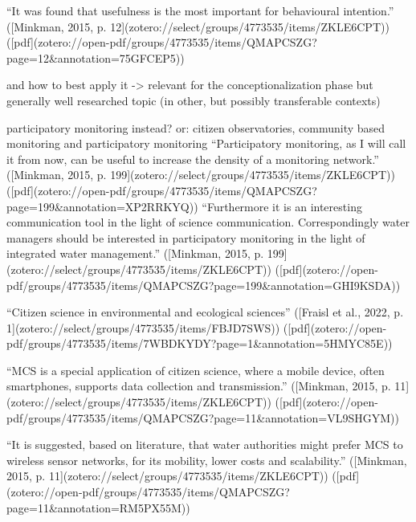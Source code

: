 “It was found that usefulness is the most important for behavioural intention.” ([Minkman, 2015, p. 12](zotero://select/groups/4773535/items/ZKLE6CPT)) ([pdf](zotero://open-pdf/groups/4773535/items/QMAPCSZG?page=12&annotation=75GFCEP5))

and how to best apply it -> relevant for the conceptionalization phase but generally well researched topic (in other, but possibly transferable contexts)




participatory monitoring instead? or: citizen observatories, community based monitoring and participatory monitoring
“Participatory monitoring, as I will call it from now, can be useful to increase the density of a monitoring network.” ([Minkman, 2015, p. 199](zotero://select/groups/4773535/items/ZKLE6CPT)) ([pdf](zotero://open-pdf/groups/4773535/items/QMAPCSZG?page=199&annotation=XP2RRKYQ))
“Furthermore it is an interesting communication tool in the light of science communication. Correspondingly water managers should be interested in participatory monitoring in the light of integrated water management.” ([Minkman, 2015, p. 199](zotero://select/groups/4773535/items/ZKLE6CPT)) ([pdf](zotero://open-pdf/groups/4773535/items/QMAPCSZG?page=199&annotation=GHI9KSDA))


“Citizen science in environmental and ecological sciences” ([Fraisl et al., 2022, p. 1](zotero://select/groups/4773535/items/FBJD7SWS)) ([pdf](zotero://open-pdf/groups/4773535/items/7WBDKYDY?page=1&annotation=5HMYC85E))

“MCS is a special application of citizen science, where a mobile device, often smartphones, supports data collection and transmission.” ([Minkman, 2015, p. 11](zotero://select/groups/4773535/items/ZKLE6CPT)) ([pdf](zotero://open-pdf/groups/4773535/items/QMAPCSZG?page=11&annotation=VL9SHGYM))

“It is suggested, based on literature, that water authorities might prefer MCS to wireless sensor networks, for its mobility, lower costs and scalability.” ([Minkman, 2015, p. 11](zotero://select/groups/4773535/items/ZKLE6CPT)) ([pdf](zotero://open-pdf/groups/4773535/items/QMAPCSZG?page=11&annotation=RM5PX55M))

